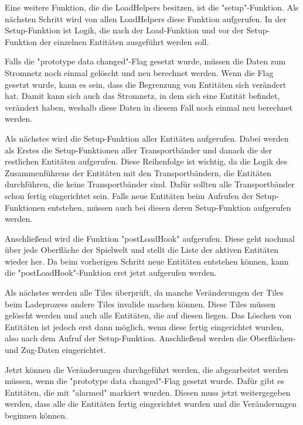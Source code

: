 Eine weitere Funktion, die die LoadHelpers besitzen, ist die "setup"-Funktion. Als nächsten Schritt wird von allen LoadHelpers diese Funktion aufgerufen. In der Setup-Funktion ist Logik, die nach der Load-Funktion und vor der Setup-Funktion der einzelnen Entitäten ausgeführt werden soll.\cite{factorioGithubSaveLoad}

Falls die "prototype data changed"-Flag gesetzt wurde, müssen die Daten zum Stromnetz noch einmal gelöscht und neu berechnet werden. Wenn die Flag gesetzt wurde, kann es sein, dass die Begrenzung von Entitäten sich verändert hat. Damit kann sich auch das Stromnetz, in dem sich eine Entität befindet, verändert haben, weshalb diese Daten in diesem Fall noch einmal neu berechnet werden.\cite{factorioGithubSaveLoad}

Als nächstes wird die Setup-Funktion aller Entitäten aufgerufen. Dabei werden als Erstes die Setup-Funktionen aller Transportbänder und danach die der restlichen Entitäten aufgerufen. Diese Reihenfolge ist wichtig, da die Logik des Zusammenführens der Entitäten mit den Transportbändern, die Entitäten durchführen, die keine Transportbänder sind. Dafür sollten alle Transportbänder schon fertig eingerichtet sein. Falls neue Entitäten beim Aufrufen der Setup-Funktionen entstehen, müssen auch bei diesen deren Setup-Funktion aufgerufen werden.\cite{factorioGithubSaveLoad}

Anschließend wird die Funktion "postLoadHook" aufgerufen. Diese geht nochmal über jede Oberfläche der Spielwelt und stellt die Liste der aktiven Entitäten wieder her. Da beim vorherigen Schritt neue Entitäten entstehen können, kann die "postLoadHook"-Funktion erst jetzt aufgerufen werden.\cite{factorioGithubSaveLoad} 

Als nächstes werden alle Tiles überprüft, da manche Veränderungen der Tiles beim Ladeprozess andere Tiles invalide machen können. Diese Tiles müssen gelöscht werden und auch alle Entitäten, die auf diesen liegen. Das Löschen von Entitäten ist jedoch erst dann möglich, wenn diese fertig eingerichtet wurden, also nach dem Aufruf der Setup-Funktion. Anschließend werden die Oberflächen- und Zug-Daten eingerichtet.\cite{factorioGithubSaveLoad}

Jetzt können die Veränderungen durchgeführt werden, die abgearbeitet werden müssen, wenn die "prototype data changed"-Flag gesetzt wurde. Dafür gibt es Entitäten, die mit "alarmed" markiert wurden. Diesen muss jetzt weitergegeben werden, dass alle die Entitäten fertig eingerichtet wurden und die Veränderungen beginnen können.\cite{factorioGithubSaveLoad}


